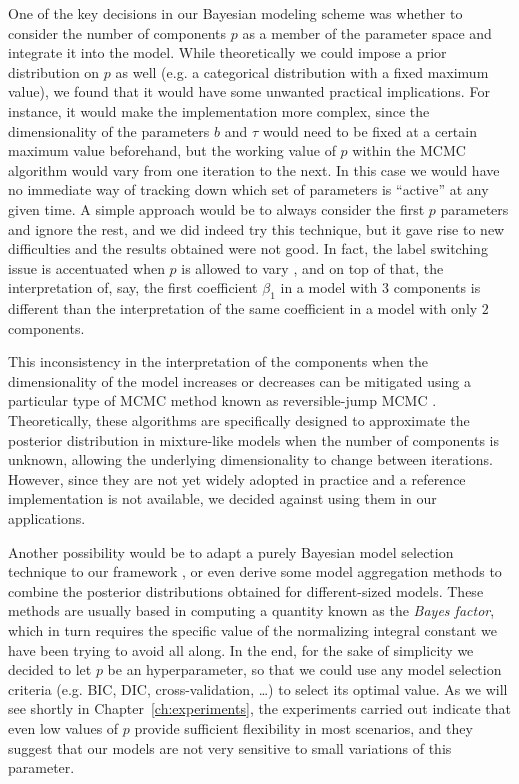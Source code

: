 One of the key decisions in our Bayesian modeling scheme was whether to consider the number of components \(p\) as a member of the parameter space and integrate it into the model. While theoretically we could impose a prior distribution on \(p\) as well (e.g. a categorical distribution with a fixed maximum value), we found that it would have some unwanted practical implications. For instance, it would make the implementation more complex, since the dimensionality of the parameters \(b\) and \(\tau\) would need to be fixed at a certain maximum value beforehand, but the working value of \(p\) within the MCMC algorithm would vary from one iteration to the next. In this case we would have no immediate way of tracking down which set of parameters is ``active'' at any given time. A simple approach would be to always consider the first \(p\) parameters and ignore the rest, and we did indeed try this technique, but it gave rise to new difficulties and the results obtained were not good. In fact, the label switching issue is accentuated when \(p\) is allowed to vary \citep[c.f.][Sec.~2.3]{grollemund2019bayesian}, and on top of that, the interpretation of, say, the first coefficient \(\beta_1\) in a model with \(3\) components is different than the interpretation of the same coefficient in a model with only \(2\) components.

This inconsistency in the interpretation of the components when the dimensionality of the model increases or decreases can be mitigated using a particular type of MCMC method known as reversible-jump MCMC \citep{green1995reversible}. Theoretically, these algorithms are specifically designed to approximate the posterior distribution in mixture-like models when the number of components is unknown, allowing the underlying dimensionality to change between iterations. However, since they are not yet widely adopted in practice and a reference implementation is not available, we decided against using them in our applications.

Another possibility would be to adapt a purely Bayesian model selection technique to our framework \citep[see][]{piironen2017comparison, gelman2013bayesian}, or even derive some model aggregation methods to combine the posterior distributions obtained for different-sized models. These methods are usually based in computing a quantity known as the \textit{Bayes factor}, which in turn requires the specific value of the normalizing integral constant we have been trying to avoid all along. In the end, for the sake of simplicity we decided to let \(p\) be an hyperparameter, so that we could use any model selection criteria (e.g. BIC, DIC, cross-validation, \ldots) to select its optimal value. As we will see shortly in Chapter~\ref{ch:experiments}, the experiments carried out indicate that even low values of \(p\) provide sufficient flexibility in most scenarios, and they suggest that our models are not very sensitive to small variations of this parameter.

